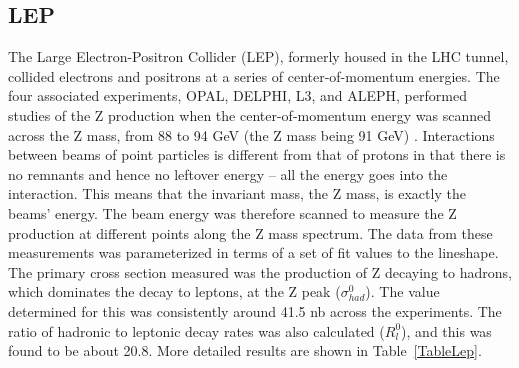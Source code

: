 \subsection{LEP}
\label{theory:lep}
The Large Electron-Positron Collider (LEP), 
formerly housed in the LHC tunnel, 
collided electrons and positrons at a 
series of center-of-momentum energies.  
The four associated experiments, 
OPAL, DELPHI, L3, and ALEPH, performed studies of 
the Z production 
when the center-of-momentum energy 
was scanned across the Z mass, 
from 88 to 94 GeV (the Z mass being %
91 GeV)
\cite{Z-PoleLep}.  
Interactions between beams of point particles 
is different from that of protons in that there is no 
remnants and hence no leftover energy -- 
all the energy goes into the interaction.  
This means that the invariant mass, 
the Z mass, is exactly the beams' energy.  
The beam energy was therefore scanned 
to measure the Z production at different 
points along the Z mass spectrum.  
The data from these measurements was parameterized 
in terms of a set of fit values to the lineshape.  
The primary cross section measured was the production 
of Z decaying to hadrons, which dominates the decay 
to leptons, at the Z peak ($\sigma_{had}^0$).  
The value determined for this was consistently 
around 41.5 nb across the experiments.  
The ratio of hadronic to leptonic decay rates 
was also calculated ($R_l^0$), 
and this was found to be about 20.8.  
More detailed results 
are shown in Table~\ref{TableLep}.  


